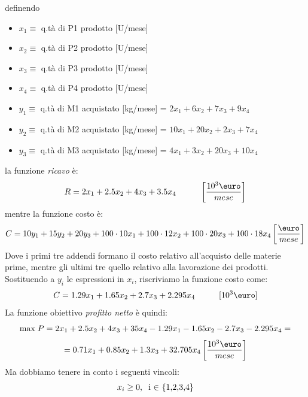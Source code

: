 definendo
\begin{itemize}
    \item $x_1 \equiv$ q.tà di P1 prodotto [U/mese]
    \item $x_2 \equiv$ q.tà di P2 prodotto [U/mese]
    \item $x_3 \equiv$ q.tà di P3 prodotto [U/mese]
    \item $x_4 \equiv$ q.tà di P4 prodotto [U/mese]
    \item $y_1 \equiv$ q.tà di M1 acquistato [kg/mese] = $2x_1 + 6x_2 + 7x_3 + 9x_4$
    \item $y_2 \equiv$ q.tà di M2 acquistato [kg/mese] = $10x_1 + 20x_2 + 2x_3 + 7x_4$
    \item $y_3 \equiv$ q.tà di M3 acquistato [kg/mese] = $4x_1 + 3x_2 + 20x_3 + 10x_4$
\end{itemize}
la funzione \textit{ricavo} è:
\begin{equation*}
    R = 2x_1 + 2.5x_2 + 4x_3 + 3.5x_4 \hspace{1cm} \left[\frac{10^3 \text{\euro}}{mese}\right]
\end{equation*}
mentre la funzione costo è:
\begin{equation*}
    C = 10y_1 + 15y_2 + 20y_3 + 100\cdot10x_1 + 100\cdot12x_2 + 100\cdot20x_3 + 100\cdot18x_4 \left[\frac{\text{\euro}}{mese}\right]
\end{equation*}
Dove i primi tre addendi formano il costo relativo all'acquisto delle materie prime, mentre gli ultimi tre quello relativo alla lavorazione dei prodotti. Sostituendo a $y_i$ le espressioni in $x_i$, riscriviamo la funzione costo come:
\begin{equation*}
    C = 1.29x_1 + 1.65x_2 + 2.7x_3 + 2.295x_4 \hspace{1cm} [10^3 \text{\euro}]
\end{equation*}
La funzione obiettivo \textit{profitto netto} è quindi:
\begin{equation*}
    \text{max} \hspace{0.1cm} P = 2x_1 + 2.5x_2 + 4x_3 + 35x_4 - 1.29x_1 - 1.65x_2 - 2.7x_3 - 2.295x_4 = 
\end{equation*}
\begin{equation*}
    = 0.71 x_1 + 0.85 x_2 + 1.3 x_3 + 32.705 x_4 \left[\frac{10^3 \text{\euro}}{mese}\right]
\end{equation*}
Ma dobbiamo tenere in conto i seguenti vincoli:
\begin{equation*}
    x_i \geq 0, \hspace{0.2cm} \text{i $\in$ \{1,2,3,4\}}
\end{equation*}
